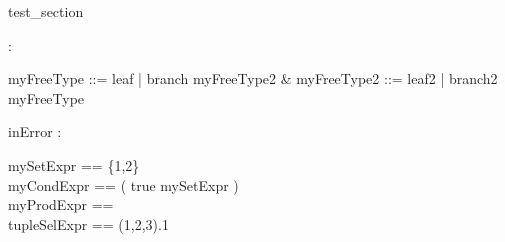 \begin{zsection}
 \SECTION test\_section
\end{zsection}


\begin{zed}
[ \arithmos ]
\end{zed}

\begin{zed}
  [A,B]
\end{zed}

\begin{axdef}
 \nat : \power \arithmos
\end{axdef}

\begin{zed}
  myFreeType ::= leaf | branch \ldata myFreeType2 \rdata &
  myFreeType2 ::= leaf2 | branch2 \ldata myFreeType \rdata
\end{zed}

\begin{axdef}
  inError : \nat
\end{axdef}

\begin{zed}
  mySetExpr == \{1,2\}\\
  myCondExpr == ( \IF true \THEN \nat \ELSE mySetExpr )\\
  myProdExpr == \nat \cross \nat \cross \nat\\
  tupleSelExpr == (1,2,3).1\\
\end{zed}
